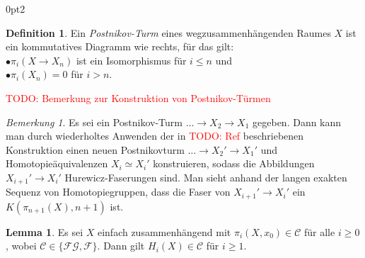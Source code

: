 \documentclass[11pt, a4paper, german]{article}
\theoremstyle{definition}
\newtheorem{lem}{Lemma}
\newtheorem{defn}{Definition}
\theoremstyle{remark}
\newtheorem*{bem}{Bemerkung}
\newcommand{\TODO}[1]{\textcolor{red}{TODO: #1}} %
\newcommand{\SC}{\mathcal{C}} %
\newcommand{\FG}{\mathcal{FG}} %
\newcommand{\F}{\mathcal{F}} %
\newenvironment{centertikzcd}
  {\begin{center}\begin{tikzcd}}
  {\end{tikzcd}\end{center}}
\begin{document}
\renewcommand\windowpagestuff{
  \iffalse
  \begin{centertikzcd}[ampersand replacement=\&, column sep=0.5cm, row sep=0.2cm]
    \& \vdots \arrow[d] \\
    \& X_3 \arrow[d] \\
    \& X_2 \arrow[d] \\
    X \arrow[r] \arrow[ru] \arrow[ruu] \& X_1
  \end{centertikzcd}
  \fi
  \vspace{1cm}
  \begin{centertikzcd}[ampersand replacement=\&, column sep=0.2cm, row sep=0.5cm]
    \&\&\& X \arrow[dll] \arrow[dl] \arrow[d] \\
    \dots \arrow[r] \&
    X_3 \arrow[r] \&
    X_2 \arrow[r] \&
    X_1
  \end{centertikzcd}
}
\opencutright
\begin{cutout}{0}{\dimexpr\linewidth-4.5cm\relax}{0pt}{2}
  \begin{defn}
    Ein \emph{Postnikov-Turm} eines wegzusammenhängenden Raumes $X$ ist ein kommutatives Diagramm wie rechts, für das gilt: \\[3pt]
    \quad$\bullet$\enspace $\pi_i(X \to X_n)$ ist ein Isomorphismus für $i \leq n$ und \\
    \quad$\bullet$\enspace $\pi_i(X_n) = 0$ für $i > n$.
  \end{defn}
\end{cutout}

\TODO{Bemerkung zur Konstruktion von Postnikov-Türmen}

\begin{bem}
  Es sei ein Postnikov-Turm $\ldots \to X_2 \to X_1$ gegeben.
  Dann kann man durch wiederholtes Anwenden der in \TODO{Ref} beschriebenen Konstruktion einen neuen Postnikovturm $\ldots \to X_2' \to X_1'$ und Homotopieäquivalenzen $X_i \simeq X_i'$ konstruieren, sodass die Abbildungen $X_{i+1}' \to X_i'$ Hurewicz-Faserungen sind.
  Man sieht anhand der langen exakten Sequenz von Homotopiegruppen, dass die Faser von $X_{i+1}' \to X_i'$ ein $K(\pi_{n+1}(X), n{+}1)$ ist.
\end{bem}

\begin{lem}\label{homotopy-in-c-implies-homology-in-c}
  Es sei $X$ einfach zusammenhängend mit $\pi_i(X, x_0) \in \SC$ für alle $i \geq 0$, wobei $\SC \in \{ \FG, \F \}$.
  Dann gilt $H_i(X) \in \SC$ für $i \geq 1$.
\end{lem}
\end{document}
